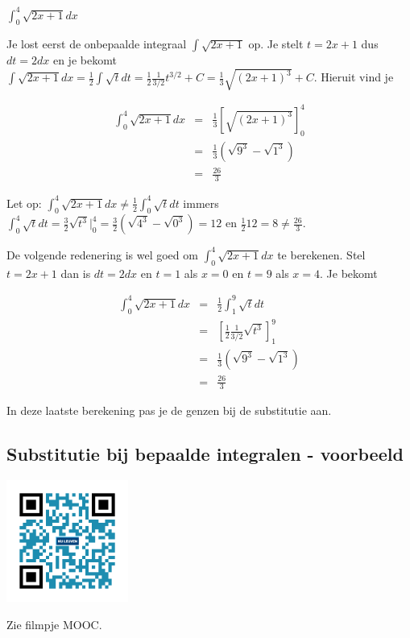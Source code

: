 \begin{voorbeeld}
	$\int ^4_0 \sqrt{2x+1}dx$

Je lost eerst de onbepaalde integraal $\int \sqrt{2x+1}$ op.
Je stelt $t=2x+1$ dus $dt=2dx$ en je bekomt $\int \sqrt {2x+1} dx=\frac{1}{2} \int \sqrt {t} dt=\frac {1}{2} \frac{1}{3/2} t^{3/2}+C=\frac{1}{3} \sqrt {(2x+1)^3}+C$.
Hieruit vind je

\begin{eqnarray*}
\int ^4_0 \sqrt {2x+1} dx&=&\frac{1}{3} \left[ \sqrt {(2x+1)^3}\right] ^4_0 \\
&=&\frac{1}{3}\left( \sqrt{9^3} - \sqrt{1^3} \right)\\
&=&\frac{26}{3}
\end{eqnarray*}

Let op: $\int ^4_0 \sqrt {2x+1}dx \neq \frac{1}{2} \int ^4_0 \sqrt {t} dt$ immers $\int ^4_0 \sqrt {t} dt=\frac{3}{2}\sqrt {t^3}\vert ^4_0=\frac{3}{2}\left( \sqrt {4^3}-\sqrt {0^3} \right)=12$ en $\frac{1}{2}12=8\neq \frac{26}{3}$.

De volgende redenering is wel goed om $\int ^4_0 \sqrt {2x+1}dx$ te berekenen.
Stel $t=2x+1$ dan is $dt=2dx$ en $t=1$ als $x=0$ en $t=9$ als $x=4$.
Je bekomt

\begin{eqnarray*}
\int ^4_0 \sqrt{2x+1}dx &=& \frac{1}{2} \int ^9_1 \sqrt {t} dt \\
&=& \left[\frac{1}{2} \frac{1}{3/2} \sqrt {t^3} \right] ^9_1 \\
&=&\frac{1}{3} \left( \sqrt{9^3}-\sqrt{1^3} \right) \\
&=&\frac{26}{3}
\end{eqnarray*}

In deze laatste berekening pas je de genzen bij de substitutie aan.

\end{voorbeeld}

\subsection{Substitutie bij bepaalde integralen - voorbeeld}
\begin{minipage}{.25\linewidth}
	\raggedright
	\includegraphics[width=4cm]{6_afgeleiden_integralen/inputs/QR_Code_SUBSTBEPVB_module6_3}
\end{minipage}
\begin{minipage}{.7\linewidth}
	Zie filmpje MOOC.
\end{minipage}


